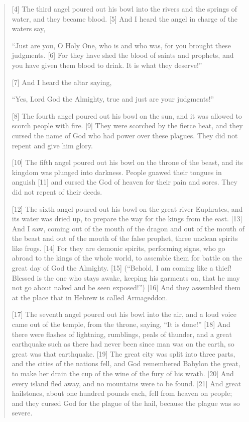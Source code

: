 \begin{quote}
    [4] The third angel poured out his bowl into the rivers and the springs
    of water, and they became blood.  [5] And I heard the angel in charge of
    the waters say,

    “Just are you, O Holy One, who is and who was,
        for you brought these judgments.
    [6] For they have shed the blood of saints and prophets,
        and you have given them blood to drink.
    It is what they deserve!”


    [7] And I heard the altar saying,

    “Yes, Lord God the Almighty,
        true and just are your judgments!”


    [8] The fourth angel poured out his bowl on the sun, and it was allowed
    to scorch people with fire.  [9] They were scorched by the fierce heat,
    and they cursed the name of God who had power over these plagues.  They
    did not repent and give him glory.

    [10] The fifth angel poured out his bowl on the throne of the beast, and
    its kingdom was plunged into darkness.  People gnawed their tongues in
    anguish [11] and cursed the God of heaven for their pain and sores.  They
    did not repent of their deeds.

    [12] The sixth angel poured out his bowl on the great river Euphrates,
    and its water was dried up, to prepare the way for the kings from the
    east.  [13] And I saw, coming out of the mouth of the dragon and out of
    the mouth of the beast and out of the mouth of the false prophet, three
    unclean spirits like frogs.  [14] For they are demonic spirits,
    performing signs, who go abroad to the kings of the whole world, to
    assemble them for battle on the great day of God the Almighty.  [15]
    (“Behold, I am coming like a thief!  Blessed is the one who stays awake,
    keeping his garments on, that he may not go about naked and be seen
    exposed!”) [16] And they assembled them at the place that in Hebrew is
    called Armageddon.

    [17] The seventh angel poured out his bowl into the air, and a loud voice
    came out of the temple, from the throne, saying, “It is done!” [18] And
    there were flashes of lightning, rumblings, peals of thunder, and a great
    earthquake such as there had never been since man was on the earth, so
    great was that earthquake.  [19] The great city was split into three
    parts, and the cities of the nations fell, and God remembered Babylon the
    great, to make her drain the cup of the wine of the fury of his wrath.
    [20] And every island fled away, and no mountains were to be found.  [21]
    And great hailstones, about one hundred pounds each, fell from heaven on
    people; and they cursed God for the plague of the hail, because the
    plague was so severe.

  \end{quote}

